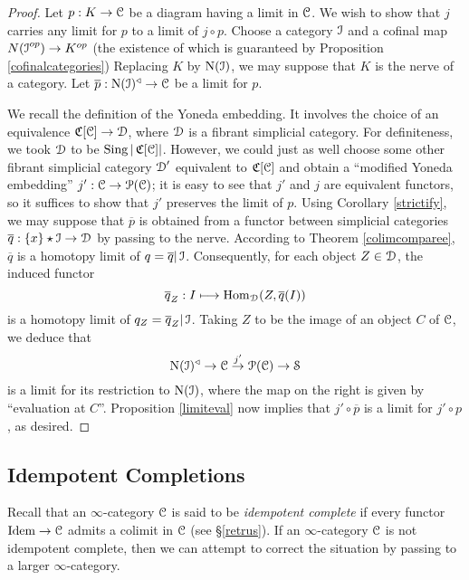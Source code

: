\begin{proof}
Let $p: K \rightarrow \operatorname{\mathcal{C}}$ be a diagram having a limit in $\operatorname{\mathcal{C}}$. We
wish to show that $j$ carries any limit for $p$ to a limit of
$j \circ p$. Choose a category $\operatorname{\mathcal{I}}$ and a cofinal map
$N(\operatorname{\mathcal{I}}^{op}) \rightarrow K^{op}$ (the existence of which is guaranteed by Proposition \ref{cofinalcategories}) Replacing $K$ by $\operatorname{N}(\operatorname{\mathcal{I}})$, we may suppose that $K$ is
the nerve of a category. Let $\overline{p}: \operatorname{N}(\operatorname{\mathcal{I}})^{\triangleleft} \rightarrow
\operatorname{\mathcal{C}}$ be a limit for $p$.

We recall the definition of the Yoneda embedding. It involves the
choice of an equivalence $\operatorname{\mathfrak{C}}[\operatorname{\mathcal{C}}] \rightarrow
\operatorname{\mathcal{D}}$, where $\operatorname{\mathcal{D}}$ is a fibrant simplicial category. For
definiteness, we took $\operatorname{\mathcal{D}}$ to be $\operatorname{Sing} |\operatorname{\mathfrak{C}}[\operatorname{\mathcal{C}}]|$. However, we could just as well
choose some other fibrant simplicial category $\operatorname{\mathcal{D}}'$ equivalent to $\operatorname{\mathfrak{C}}[\operatorname{\mathcal{C}}]$ and
obtain a ``modified Yoneda embedding'' $j': \operatorname{\mathcal{C}} \rightarrow \operatorname{\mathcal{P}}(\operatorname{\mathcal{C}})$; it is easy to see that
$j'$ and $j$ are equivalent functors, so it suffices to show that $j'$ preserves the limit of $p$.
Using Corollary \ref{strictify}, we may suppose that $\overline{p}$ is obtained
from a functor between simplicial categories
$\overline{q}: \{x\} \star \operatorname{\mathcal{I}} \rightarrow \operatorname{\mathcal{D}}$ by passing to the nerve. According to Theorem \ref{colimcomparee}, $\overline{q}$ is a homotopy limit of $q = \overline{q} | \operatorname{\mathcal{I}}$.
Consequently, for each object $Z \in \operatorname{\mathcal{D}}$, the induced functor
$$ \overline{q}_Z: I \longmapsto \operatorname{Hom}_{\operatorname{\mathcal{D}}}(Z, \overline{q}(I))$$
is a homotopy limit of $q_Z = \overline{q}_Z|\operatorname{\mathcal{I}}$. Taking $Z$ to be the image of an object
$C$ of $\operatorname{\mathcal{C}}$, we deduce that
$$ \operatorname{N}(\operatorname{\mathcal{I}})^{\triangleleft} \rightarrow \operatorname{\mathcal{C}} \stackrel{j'}{\rightarrow} \operatorname{\mathcal{P}}(\operatorname{\mathcal{C}}) \rightarrow \operatorname{\mathcal{S}}$$
is a limit for its restriction to $\operatorname{N}(\operatorname{\mathcal{I}})$, where the map on the right is given by ``evaluation at $C$''. Proposition \ref{limiteval} now implies that $j' \circ \overline{p}$ is a limit for $j' \circ p$, as desired.
\end{proof}

\subsection{Idempotent Completions}\label{surot}

Recall that an $\infty$-category $\operatorname{\mathcal{C}}$ is said to be {\it idempotent complete} if every
functor $\operatorname{Idem} \rightarrow \operatorname{\mathcal{C}}$ admits a colimit in $\operatorname{\mathcal{C}}$ (see \S \ref{retrus}).
If an $\infty$-category $\operatorname{\mathcal{C}}$ is not idempotent complete, then we can attempt to correct the situation by passing to a larger $\infty$-category.

